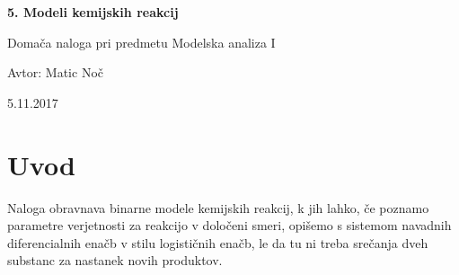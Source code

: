 \documentclass[11pt, a4paper]{article}
\begin{document}
    \begin{center}
    {\LARGE\bfseries 5. Modeli kemijskih reakcij\par}
    \vspace{1cm}
    
    {\Large Domača naloga pri predmetu Modelska analiza I\par}
    \vspace{0.2cm}
    {\normalsize Avtor: Matic Noč \par}
    \vspace{0.2cm}    
    {\normalsize 5.11.2017 \par}    

    
    \end{center}

\section{Uvod}
Naloga obravnava binarne modele kemijskih reakcij, k jih lahko, če poznamo parametre verjetnosti za reakcijo v določeni smeri, opišemo s sistemom navadnih diferencialnih enačb v stilu logističnih enačb, le da tu ni treba srečanja dveh substanc za nastanek novih produktov.
\end{document}
